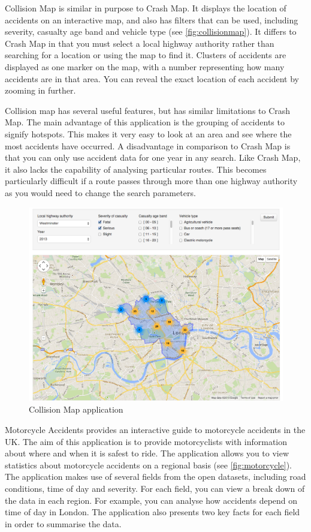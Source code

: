 \documentclass[authoryearcitations]{UoYCSproject}
\begin{document}
Collision Map \citep{DepartmentforTransport} is similar in purpose to Crash Map. It displays the location of accidents on an interactive map, and also has filters that can be used, including severity, casualty age band and vehicle type (see \autoref{fig:collisionmap}). It differs to Crash Map in that you must select a local highway authority rather than searching for a location or using the map to find it. Clusters of accidents are displayed as one marker on the map, with a number representing how many accidents are in that area. You can reveal the exact location of each accident by zooming in further.

Collision map has several useful features, but has similar limitations to Crash Map. The main advantage of this application is the grouping of accidents to signify hotspots. This makes it very easy to look at an area and see where the most accidents have occurred. A disadvantage in comparison to Crash Map is that you can only use accident data for one year in any search. Like Crash Map, it also lacks the capability of analysing particular routes. This becomes particularly difficult if a route passes through more than one highway authority as you would need to change the search parameters. 

\begin{figure}
	\includegraphics[scale=0.3]{collisionmap}
	\caption{Collision Map application}
	\label{fig:collisionmap}
\end{figure}

Motorcycle Accidents \citep{Mceinsurance} provides an interactive guide to motorcycle accidents in the UK. The aim of this application is to provide motorcyclists with information about where and when it is safest to ride. The application allows you to view statistics about motorcycle accidents on a regional basis (see \autoref{fig:motorcycle}). The application makes use of several fields from the open datasets, including road conditions, time of day and severity. For each field, you can view a break down of the data in each region. For example, you can analyse how accidents depend on time of day in London. The application also presents two key facts for each field in order to summarise the data.
\end{document}
